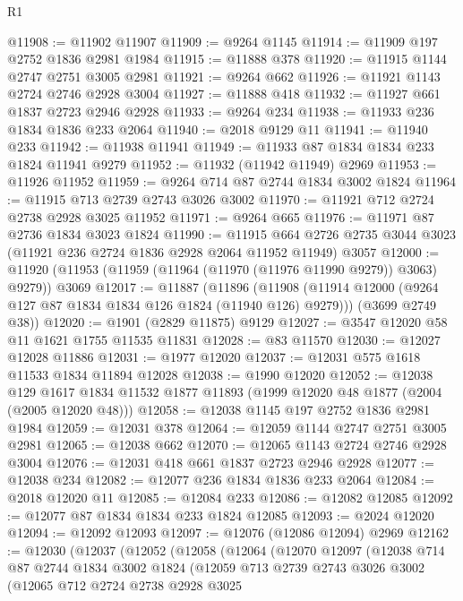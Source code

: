 \begin{lexlean}{R1}
\begin{coremodule}
@11908 := @11902 @11907
@11909 := @9264 @1145
@11914 := @11909 @197 @2752 @1836 @2981 @1984
@11915 := @11888 @378
@11920 := @11915 @1144 @2747 @2751 @3005 @2981
@11921 := @9264 @662
@11926 := @11921 @1143 @2724 @2746 @2928 @3004
@11927 := @11888 @418
@11932 := @11927 @661 @1837 @2723 @2946 @2928
@11933 := @9264 @234
@11938 := @11933 @236 @1834 @1836 @233 @2064
@11940 := @2018 @9129 @11
@11941 := @11940 @233
@11942 := @11938 @11941
@11949 := @11933 @87 @1834 @1834 @233 @1824 @11941 @9279
@11952 := @11932 (@11942 @11949) @2969
@11953 := @11926 @11952
@11959 := @9264 @714 @87 @2744 @1834 @3002 @1824
@11964 := @11915 @713 @2739 @2743 @3026 @3002
@11970 := @11921 @712 @2724 @2738 @2928 @3025 @11952
@11971 := @9264 @665
@11976 := @11971 @87 @2736 @1834 @3023 @1824
@11990 := @11915
    @664
    @2726
    @2735
    @3044
    @3023
    (@11921 @236 @2724 @1836 @2928 @2064 @11952 @11949)
    @3057
@12000 := @11920 (@11953 (@11959 (@11964 (@11970 (@11976 @11990 @9279)) @3063) @9279)) @3069
@12017 := @11887
    (@11896
      (@11908 (@11914 @12000 (@9264 @127 @87 @1834 @1834 @126 @1824 (@11940 @126) @9279)))
      (@3699 @2749 @38))
@12020 := @1901 (@2829 @11875) @9129
@12027 := @3547 @12020 @58 @11 @1621 @1755 @11535 @11831
@12028 := @83 @11570
@12030 := @12027 @12028 @11886
@12031 := @1977 @12020
@12037 := @12031 @575 @1618 @11533 @1834 @11894 @12028
@12038 := @1990 @12020
@12052 := @12038
    @129
    @1617
    @1834
    @11532
    @1877
    @11893
    (@1999 @12020 @48 @1877 (@2004 (@2005 @12020 @48)))
@12058 := @12038 @1145 @197 @2752 @1836 @2981 @1984
@12059 := @12031 @378
@12064 := @12059 @1144 @2747 @2751 @3005 @2981
@12065 := @12038 @662
@12070 := @12065 @1143 @2724 @2746 @2928 @3004
@12076 := @12031 @418 @661 @1837 @2723 @2946 @2928
@12077 := @12038 @234
@12082 := @12077 @236 @1834 @1836 @233 @2064
@12084 := @2018 @12020 @11
@12085 := @12084 @233
@12086 := @12082 @12085
@12092 := @12077 @87 @1834 @1834 @233 @1824 @12085
@12093 := @2024 @12020
@12094 := @12092 @12093
@12097 := @12076 (@12086 @12094) @2969
@12162 := @12030
    (@12037
      (@12052
        (@12058
          (@12064
            (@12070
              @12097
              (@12038
                @714
                @87
                @2744
                @1834
                @3002
                @1824
                (@12059
                  @713
                  @2739
                  @2743
                  @3026
                  @3002
                  (@12065
                    @712
                    @2724
                    @2738
                    @2928
                    @3025

\end{coremodule}
\end{lexlean}

